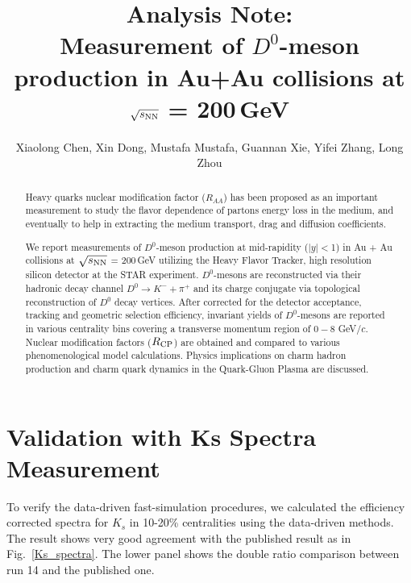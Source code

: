 \documentclass[a4paper]{article}
\title{Analysis Note: \\
Measurement of $D^0$-meson production in Au+Au collisions at $\sqrt{s_{\rm NN}}$ = 200\,GeV}
\author{Xiaolong Chen, Xin Dong, Mustafa Mustafa, Guannan Xie, Yifei Zhang, Long Zhou}
\begin{document}
\maketitle

\begin{abstract}

Heavy quarks nuclear modification factor ($R_{AA}$) has been proposed as an important measurement to study the flavor dependence of partons energy loss in the medium, and eventually to help in extracting the medium transport, drag and diffusion coefficients.


We report measurements of $D^0$-meson production at mid-rapidity ($|y|<$1) in Au + Au collisions at $\sqrt{s_{\rm NN}}$ = 200\,GeV utilizing the Heavy Flavor Tracker, high resolution silicon detector at the STAR experiment. $D^0$-mesons are reconstructed via their hadronic decay channel $D^0\rightarrow K^-+\pi^+$ and its charge conjugate via topological reconstruction of $D^0$ decay vertices. After corrected for the detector acceptance, tracking and geometric selection efficiency, invariant yields of $D^0$-mesons are reported in various centrality bins covering a transverse momentum region of $0-8$ GeV/$c$. Nuclear modification factors ($R_{\rm CP}$) are obtained and compared to various phenomenological model calculations. Physics implications on charm hadron production and charm quark dynamics in the Quark-Gluon Plasma are discussed.

\end{abstract}

\clearpage

\tableofcontents








\section{Validation with Ks Spectra Measurement}
 To verify the data-driven fast-simulation procedures, we calculated the efficiency corrected spectra for $K_{s}$ in 10-20\% centralities using the data-driven methods. The result shows very good agreement with the published result as in Fig.~\ref{Ks_spectra}. The lower panel shows the double ratio comparison between run 14 and the published one.
\end{document}
